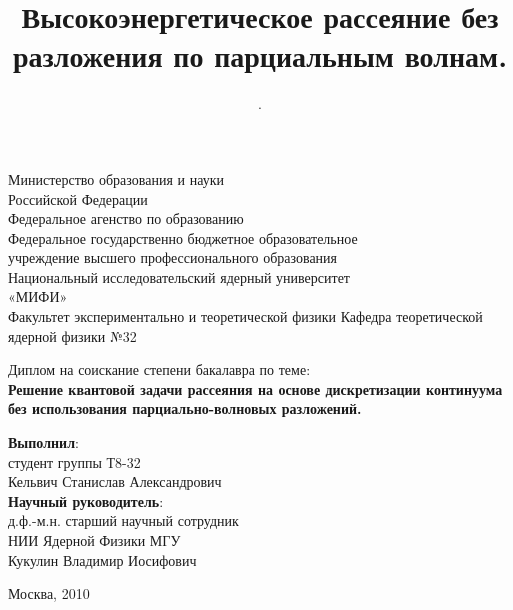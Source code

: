 \documentclass[a4paper,12pt]{article}
\title{Высокоэнергетическое рассеяние без разложения по парциальным волнам.}
\author{.}
\begin{document}
	
	
  \begin{titlepage}
  
  \begin{center}
	Министерство образования и науки \\
	Российской Федерации \\ 
	Федеральное агенство по образованию \\ 
	Федеральное государственно бюджетное образовательное \\
	учреждение высшего профессионального образования \\
	Национальный исследовательский ядерный университет \\
	«МИФИ» \\
	Факультет экспериментально и теоретической физики
	Кафедра теоретической ядерной физики №32
	\end{center}
	
	\vspace{1cm}
	
	\begin{center}\Large
	Диплом на соискание степени бакалавра по теме: \\
	\bf{Решение квантовой задачи рассеяния на основе дискретизации континуума без использования парциально-волновых разложений.}
  \end{center}
  
  \vspace{1cm}
	
	\begin{flushright}
	\textbf{Выполнил}: \\
	студент группы Т8-32 \\
	Кельвич Станислав Александрович \\
	\vspace{1cm}
	\textbf{Научный руководитель}: \\
	д.ф.-м.н. старший научный сотрудник \\
	НИИ Ядерной Физики МГУ \\
	Кукулин Владимир Иосифович \\
	\end{flushright}
	
	\vspace{1.5cm}
	\begin{center}
	  Москва, 2010
	\end{center}
	
  \end{titlepage}
	\pagebreak
	
\end{document}
